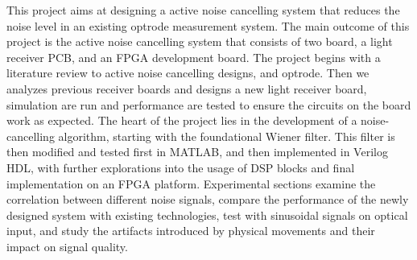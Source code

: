 This project aims at designing a active noise cancelling system that reduces the noise level in an existing optrode measurement system. The main outcome of this project is the active noise cancelling system that consists of two board, a light receiver PCB, and an FPGA development board. The project begins with a literature review to active noise cancelling designs, and optrode.  Then we analyzes previous receiver boards and designs a new light receiver board, simulation are run and performance are tested to ensure the circuits on the board work as expected. The heart of the project lies in the development of a noise-cancelling algorithm, starting with the foundational Wiener filter. This filter is then modified and tested first in MATLAB, and then implemented in Verilog HDL, with further explorations into the usage of DSP blocks and final implementation on an FPGA platform.  Experimental sections examine the correlation between different noise signals, compare the performance of the newly designed system with existing technologies, test with sinusoidal signals on optical input, and study the artifacts introduced by physical movements and their impact on signal quality.
